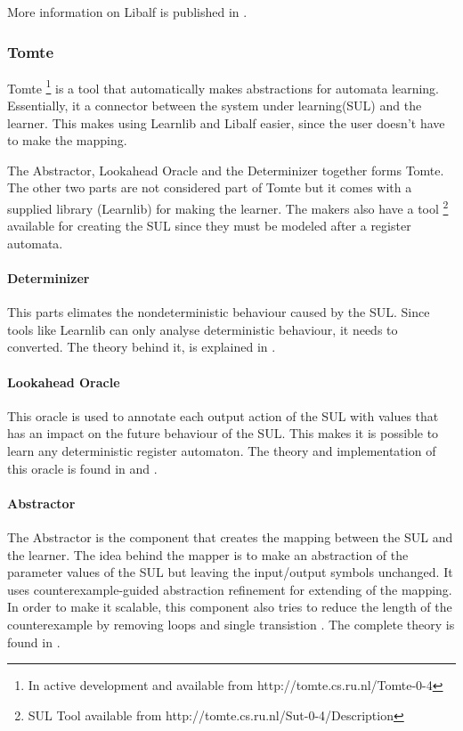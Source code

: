 \documentclass[multi,crop=false,class=article]{standalone}
\begin{document}
More information on Libalf is published in \cite{Bollig2010}.

\subsubsection{Tomte}
\label{sssec:tomte}
Tomte \footnote{In active development and available from
http://tomte.cs.ru.nl/Tomte-0-4} is a tool that automatically makes
abstractions for automata learning. Essentially, it a connector between the
system under learning(SUL) and the learner. This makes using Learnlib and
Libalf easier, since the user doesn't have to make the mapping.


The Abstractor, Lookahead Oracle and the Determinizer together forms Tomte. The
other two parts are not considered part
of Tomte but it comes with a supplied library (Learnlib) for making the learner.
The makers also have a tool \footnote{SUL Tool available from
http://tomte.cs.ru.nl/Sut-0-4/Description} available for creating the SUL since
they must be modeled after a register automata.

\paragraph{Determinizer}
This parts elimates the nondeterministic behaviour caused by the SUL. Since
tools like Learnlib can only analyse deterministic behaviour, it needs to
converted. The theory behind it, is explained in \cite{Aarts2015}.

\paragraph{Lookahead Oracle}
This oracle is used to annotate each output action of the SUL with values that
has an impact on the future behaviour of the SUL. This makes it is possible to
learn any deterministic register automaton. The theory and implementation of
this oracle is found in \cite{Aarts2014} and \cite{tomte14}.

\paragraph{Abstractor}
The Abstractor is the component that creates the mapping between the SUL and
the learner. The idea behind the mapper is to make an abstraction of the
parameter values of the SUL but leaving the input/output symbols unchanged. It
uses counterexample-guided abstraction refinement\cite{tomte14} for extending
of the mapping. In order to make it scalable, this component also tries to
reduce the length of the counterexample by removing loops and single
transistion \cite{Koopman2014}. The complete theory is found in \cite{tomte14}.
\end{document}
